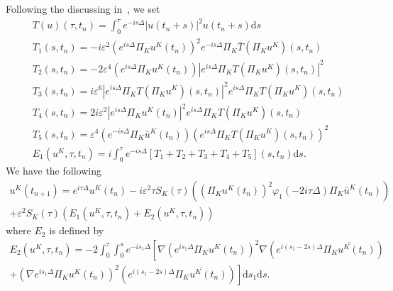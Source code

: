 \documentclass[10pt,a4paper]{article}
\begin{document}
  Following the discussing in~\cite{ORS21}, we set
  \begin{align}
    \label{TOp}& T(u)(\tau,t_n) = \int_0^{\tau} e^{-is\Delta} |u(t_n+s)|^2 u(t_n+s) \mathrm{d} s \\
    \label{T1} & T_1(s, t_n) = -i\varepsilon^2 \left(e^{i s \Delta} \Pi_K u^K\left(t_n\right)\right)^2 e^{-i s \Delta} \Pi_K \bar{T}\left(\Pi_K u^K\right)\left(s, t_n\right) \\
    \label{T2} & T_2(s, t_n) = -2\varepsilon^4 \left(e^{i s \Delta} \Pi_K u^K\left(t_n\right)\right)\left|e^{i s \Delta} \Pi_K T\left(\Pi_K u^K\right)\left(s, t_n\right)\right|^2 \\
    \label{T3} & T_3(s, t_n) = i\varepsilon^6 \left|e^{i s \Delta} \Pi_K T\left(\Pi_K u^K\right)\left(s, t_n\right)\right|^2 e^{i s \Delta} \Pi_K T\left(\Pi_K u^K\right)\left(s, t_n\right) \\
    \label{T4} & T_4(s, t_n) = 2i\varepsilon^2 \left|e^{i s \Delta} \Pi_K u^K\left(t_n\right)\right|^2 e^{i s \Delta} \Pi_K T\left(\Pi_K u^K\right)\left(s, t_n\right) \\
    \label{T5} & T_5(s, t_n) = \varepsilon^4 \left(e^{-i s \Delta} \Pi_K \bar{u}^K\left(t_n\right)\right)\left(e^{i s \Delta} \Pi_K T\left(\Pi_K u^K\right)\left(s, t_n\right)\right)^2 \\
    \label{E1} & E_1(u^K, \tau, t_n) = i \int_0^{\tau} e^{-is\Delta} 
    [T_1 + T_2 + T_3 + T_4 + T_5](s, t_n) \mathrm{d} s.
  \end{align}
  We have the following
  \begin{multline}
    u^K(t_{n+1}) = e^{i\tau\Delta}u^K(t_n) 
    - i\varepsilon^2\tau S_K(\tau) \left( \left(\Pi_K u^K(t_n)\right)^2 
    \varphi_1(-2i\tau\Delta)\Pi_K \bar{u}^K(t_n) \right) \\
    + \varepsilon^2 S_K(\tau) \left( E_1(u^K, \tau, t_n) + E_2(u^K, \tau, t_n) 
    \right)
  \end{multline}
  where \(E_2\) is defined by 
  \begin{multline}\label{E2}
    E_2(u^K, \tau, t_n) = -2 \int_0^{\tau} \int_0^s e^{-is_1\Delta} \left[
    \nabla \left(e^{is_1\Delta}\Pi_K u^K(t_n)\right)^2 
    \nabla \left(e^{i(s_1-2s)\Delta}\overline{\Pi_K u^K(t_n)}\right)\right. \\
    \left.+ \left( \nabla e^{is_1\Delta}\Pi_K u^K(t_n) \right)^2 
    \left( e^{i(s_1-2s)\Delta}\overline{\Pi_K u^K(t_n)} \right) 
    \right] \mathrm{d}s_1\mathrm{d}s .
  \end{multline}
  
\end{document}
